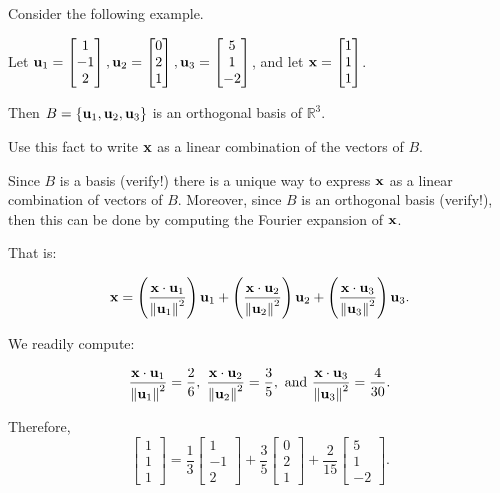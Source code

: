 \documentclass{ximera}
\begin{document}
Consider the following example.

\begin{example}\label{fourier}
Let
${\bf u}_1= \begin{bmatrix}
1 \\ -1 \\ 2
\end{bmatrix},
{\bf u}_2= \begin{bmatrix}
0 \\ 2 \\ 1 
\end{bmatrix},
{\bf u}_3 =\begin{bmatrix}
5 \\ 1 \\ -2
\end{bmatrix}$,
and let
${\bf x} =\begin{bmatrix}
1 \\ 1 \\ 1
\end{bmatrix}$.  

Then $B=\{ {\bf u}_1, {\bf u}_2, {\bf u}_3\}$
is an orthogonal basis of $\mathbb{R}^3$.

Use this fact to write ${\bf x}$ as  a linear combination of the vectors of $B$.
\end{example}

\begin{explanation}
Since $B$ is a basis (verify!) there is a unique way to express ${\bf x}$ as a
linear combination of vectors of $B$. Moreover, since $B$ is an
orthogonal basis (verify!), then this can be done by computing the
Fourier expansion of ${\bf x}$.

That is:

\[
{\bf x}   =
\left(\frac{{\bf x}\cdot {\bf u}_1}{\left\lVert{\bf u}_1\right\rVert^2}\right) {\bf u}_1 +
\left(\frac{{\bf x}\cdot {\bf u}_2}{\left\lVert{\bf u}_2\right\rVert^2}\right) {\bf u}_2 +
\left(\frac{{\bf x}\cdot {\bf u}_3}{\left\lVert{\bf u}_3\right\rVert^2}\right) {\bf u}_3.
\]

We readily compute:

\[
\frac{{\bf x}\cdot{\bf u}_1}{\left\lVert{\bf u}_1\right\rVert^2} = \frac{2}{6}, \;
\frac{{\bf x}\cdot{\bf u}_2}{\left\lVert{\bf u}_2\right\rVert^2} = \frac{3}{5},
\mbox{ and }
\frac{{\bf x}\cdot{\bf u}_3}{\left\lVert{\bf u}_3\right\rVert^2} = \frac{4}{30}.\]

Therefore,
\[ \begin{bmatrix}
1 \\ 1 \\ 1
\end{bmatrix}
= \frac{1}{3}\begin{bmatrix}
1 \\ -1 \\ 2
\end{bmatrix}
+\frac{3}{5}\begin{bmatrix}
0 \\ 2 \\ 1
\end{bmatrix}
+\frac{2}{15}\begin{bmatrix}
5 \\ 1 \\ -2
\end{bmatrix}.\]
\end{explanation} 
\end{document}
